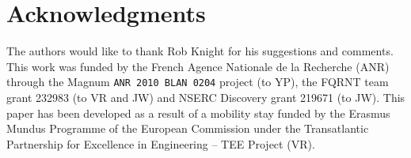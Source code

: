 \documentclass{bioinfo}
\begin{document}
\section{Acknowledgments}
\label{sec:acknowledgments}
The authors would like to thank Rob Knight for his suggestions and comments.
This work was funded by the French Agence Nationale de la Recherche (ANR) through the {\sc Magnum} {\tt ANR 2010 BLAN 0204} 
project (to YP), the
FQRNT team grant 232983 (to VR and JW) and NSERC Discovery grant 219671 (to JW). This paper has been developed as a result of a mobility stay funded by the Erasmus Mundus Programme of the European Commission under the Transatlantic Partnership for Excellence in Engineering – TEE Project (VR).





%
\end{document}
